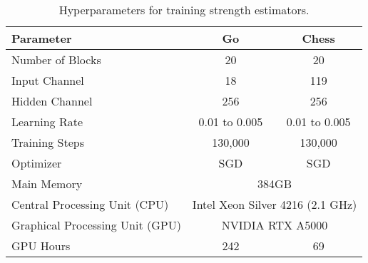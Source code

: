 \begin{table}[h]
    \caption{Hyperparameters for training strength estimators.}
    \vskip 0.1in
    \centering
    \begin{tabular}{lcc}
        \toprule
        \textbf{Parameter} & Go & Chess \\
        \midrule
        Number of Blocks & 20 & 20 \\
        Input Channel & 18 & 119\\
        Hidden Channel & 256 & 256 \\
        Learning Rate & 0.01 to 0.005 & 0.01 to 0.005 \\
        Training Steps & 130,000 & 130,000  \\
        Optimizer & SGD & SGD \\
        \midrule
        Main Memory & \multicolumn{2}{c}{384GB} \\
        Central Processing Unit (CPU) & \multicolumn{2}{c}{Intel Xeon Silver 4216 (2.1 GHz)} \\        
        Graphical Processing Unit (GPU) & \multicolumn{2}{c}{NVIDIA RTX A5000} \\
        GPU Hours & 242 & 69\\
        \bottomrule
    \end{tabular}
    \label{tbl:training_details}
\end{table}





        
